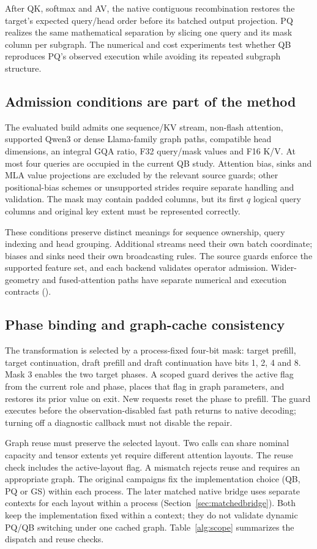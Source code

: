 After QK, softmax and AV, the native contiguous recombination restores the target's expected query/head order before its batched output projection. PQ realizes the same mathematical separation by slicing one query and its mask column per subgraph. The numerical and cost experiments test whether QB reproduces PQ's observed execution while avoiding its repeated subgraph structure.

\subsection{Admission conditions are part of the method}
The evaluated build admits one sequence/KV stream, non-flash attention, supported Qwen3 or dense Llama-family graph paths, compatible head dimensions, an integral GQA ratio, F32 query/mask values and F16 K/V. At most four queries are occupied in the current QB study. Attention bias, sinks and MLA value projections are excluded by the relevant source guards; other positional-bias schemes or unsupported strides require separate handling and validation. The mask may contain padded columns, but its first $q$ logical query columns and original key extent must be represented correctly.

These conditions preserve distinct meanings for sequence ownership, query indexing and head grouping. Additional streams need their own batch coordinate; biases and sinks need their own broadcasting rules. The source guards enforce the supported feature set, and each backend validates operator admission. Wider-geometry and fused-attention paths have separate numerical and execution contracts ().

\subsection{Phase binding and graph-cache consistency}
The transformation is selected by a process-fixed four-bit mask: target prefill, target continuation, draft prefill and draft continuation have bits 1, 2, 4 and 8. Mask 3 enables the two target phases. A scoped guard derives the active flag from the current role and phase, places that flag in graph parameters, and restores its prior value on exit. New requests reset the phase to prefill. The guard executes before the observation-disabled fast path returns to native decoding; turning off a diagnostic callback must not disable the repair.

Graph reuse must preserve the selected layout. Two calls can share nominal capacity and tensor extents yet require different attention layouts. The reuse check includes the active-layout flag. A mismatch rejects reuse and requires an appropriate graph. The original campaigns fix the implementation choice (QB, PQ or GS) within each process. The later matched native bridge uses separate contexts for each layout within a process (Section~\ref{sec:matchedbridge}). Both keep the implementation fixed within a context; they do not validate dynamic PQ/QB switching under one cached graph. Table~\ref{alg:scope} summarizes the dispatch and reuse checks.

